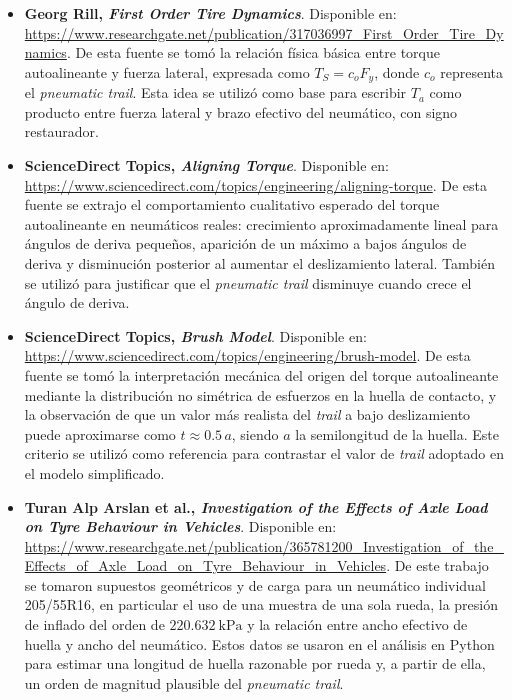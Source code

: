 \documentclass{article}
\begin{document}
\begin{itemize}
    \item \hypertarget{ref:rill-first-order}{}\textbf{Georg Rill, \textit{First Order Tire Dynamics}}. Disponible en: \url{https://www.researchgate.net/publication/317036997_First_Order_Tire_Dynamics}. De esta fuente se tomó la relación física básica entre torque autoalineante y fuerza lateral, expresada como $T_S = c_o F_y$, donde $c_o$ representa el \textit{pneumatic trail}. Esta idea se utilizó como base para escribir $T_a$ como producto entre fuerza lateral y brazo efectivo del neumático, con signo restaurador.

    \item \textbf{ScienceDirect Topics, \textit{Aligning Torque}}. Disponible en: \url{https://www.sciencedirect.com/topics/engineering/aligning-torque}. De esta fuente se extrajo el comportamiento cualitativo esperado del torque autoalineante en neumáticos reales: crecimiento aproximadamente lineal para ángulos de deriva pequeños, aparición de un máximo a bajos ángulos de deriva y disminución posterior al aumentar el deslizamiento lateral. También se utilizó para justificar que el \textit{pneumatic trail} disminuye cuando crece el ángulo de deriva.

    \item \textbf{ScienceDirect Topics, \textit{Brush Model}}. Disponible en: \url{https://www.sciencedirect.com/topics/engineering/brush-model}. De esta fuente se tomó la interpretación mecánica del origen del torque autoalineante mediante la distribución no simétrica de esfuerzos en la huella de contacto, y la observación de que un valor más realista del \textit{trail} a bajo deslizamiento puede aproximarse como $t \approx 0.5\,a$, siendo $a$ la semilongitud de la huella. Este criterio se utilizó como referencia para contrastar el valor de \textit{trail} adoptado en el modelo simplificado.

    \item \textbf{Turan Alp Arslan et al., \textit{Investigation of the Effects of Axle Load on Tyre Behaviour in Vehicles}}. Disponible en: \url{https://www.researchgate.net/publication/365781200_Investigation_of_the_Effects_of_Axle_Load_on_Tyre_Behaviour_in_Vehicles}. De este trabajo se tomaron supuestos geométricos y de carga para un neumático individual 205/55R16, en particular el uso de una muestra de una sola rueda, la presión de inflado del orden de $220.632\ \mathrm{kPa}$ y la relación entre ancho efectivo de huella y ancho del neumático. Estos datos se usaron en el análisis en Python para estimar una longitud de huella razonable por rueda y, a partir de ella, un orden de magnitud plausible del \textit{pneumatic trail}.


\end{itemize}
\end{document}

